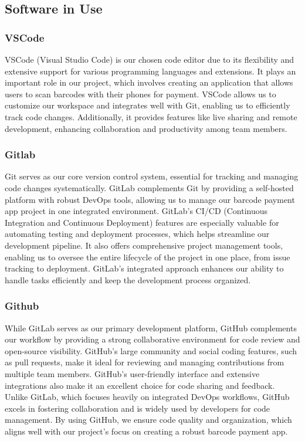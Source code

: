 \documentclass[conference]{IEEEtran}
\begin{document}
\subsection{Software in Use}
\subsubsection{VSCode}
VSCode (Visual Studio Code) is our chosen code editor due to its flexibility and extensive support for various programming languages and extensions. It plays an important role in our project, which involves creating an application that allows users to scan barcodes with their phones for payment. VSCode allows us to customize our workspace and integrates well with Git, enabling us to efficiently track code changes. Additionally, it provides features like live sharing and remote development, enhancing collaboration and productivity among team members. 

\subsubsection{Gitlab}
Git serves as our core version control system, essential for tracking and managing code changes systematically. GitLab complements Git by providing a self-hosted platform with robust DevOps tools, allowing us to manage our barcode payment app project in one integrated environment. GitLab’s CI/CD (Continuous Integration and Continuous Deployment) features are especially valuable for automating testing and deployment processes, which helps streamline our development pipeline. It also offers comprehensive project management tools, enabling us to oversee the entire lifecycle of the project in one place, from issue tracking to deployment. GitLab’s integrated approach enhances our ability to handle tasks efficiently and keep the development process organized. 

\subsubsection{Github}
While GitLab serves as our primary development platform, GitHub complements our workflow by providing a strong collaborative environment for code review and open-source visibility. GitHub’s large community and social coding features, such as pull requests, make it ideal for reviewing and managing contributions from multiple team members. GitHub's user-friendly interface and extensive integrations also make it an excellent choice for code sharing and feedback. Unlike GitLab, which focuses heavily on integrated DevOps workflows, GitHub excels in fostering collaboration and is widely used by developers for code management. By using GitHub, we ensure code quality and organization, which aligns well with our project’s focus on creating a robust barcode payment app. 
\end{document}
